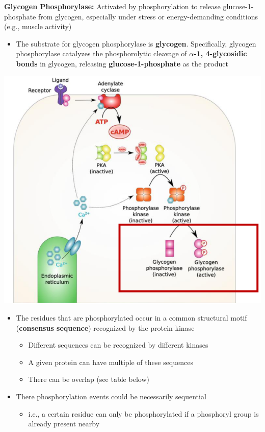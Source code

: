 \documentclass[10pt]{article}
\begin{document}
\textbf{Glycogen Phosphorylase:} Activated by phosphorylation to release glucose-1-phosphate from glycogen, especially under stress or energy-demanding conditions (e.g., muscle activity)
\begin{itemize}
    \item The substrate for glycogen phosphorylase is \textbf{glycogen}.  Specifically, glycogen phosphorylase catalyzes the phosphorolytic cleavage of \textbf{$\alpha$-1, 4-glycosidic bonds} in glycogen, releasing \textbf{glucose-1-phosphate} as the product
\end{itemize}
\begin{center} 
	\includegraphics*[scale=0.5]{L1_15.png}
\end{center}
\begin{itemize}
	\item The residues that are phosphorylated occur in a common structural motif (\textbf{consensus sequence}) recognized by the protein kinase
	\begin{itemize}
        \item Different sequences can be recognized by different kinases
        \item A given protein can have multiple of these sequences
        \item There can be overlap (see table below)
    \end{itemize}
    \item There phosphorylation events could be necessarily sequential
    \begin{itemize}
        \item i.e., a certain residue can only be phosphorylated if a phosphoryl group is already present nearby
    \end{itemize}
\end{itemize}
\end{document}

